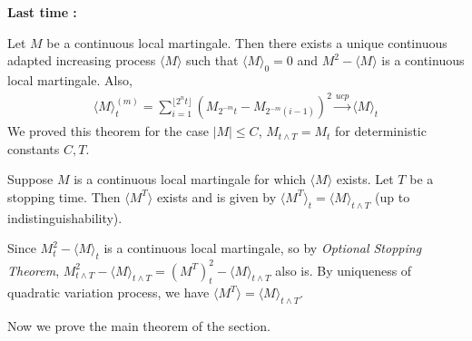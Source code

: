 \documentclass[12pt,a4paper]{article}
\newenvironment{proof}
{\begin{changemargin}{0.5cm}{0.5cm} 
	}%
	{\end{changemargin}
}
\newenvironment{p}
{\begin{proof} 
	}%
	{\end{proof}
}
\begin{document}
\textbf{Last time :}

\thm Let $M$ be a continuous local martingale. Then there exists a unique continuous adapted increasing process $\langle M \rangle$ such that $\langle  M \rangle_0 = 0$ and $M^2 - \langle M \rangle$ is a continuous local martingale. Also,
\begin{align*}
\langle M \rangle_t^{(m)} = \sum_{i=1}^{\lfloor 2^n t \rfloor} (M_{2^{-m}t} - M_{2^{-m}(i-1)})^2 \xrightarrow{ucp} \langle M \rangle_t
\end{align*}
We proved this theorem for the case $|M|\leq C$, $M_{t\wedge T} = M_t$ for deterministic constants $C, T$. 
\s

\lem Suppose $M$ is a continuous local martingale for which $\langle M \rangle$ exists. Let $T$ be a stopping time. Then $\langle M^T \rangle$ exists and is given by $\langle M^T\rangle_t = \langle M \rangle_{t\wedge T}$ (up to indistinguishability).
\begin{p}
\pf Since $M_t^2 - \langle M \rangle_t$ is a continuous local martingale, so by \emph{Optional Stopping Theorem}, $M^2_{t\wedge T} - \langle M\rangle_{t\wedge T}= (M^T)^2_t - \langle M \rangle_{t\wedge T}$ also is. By uniqueness of quadratic variation process, we have $\langle M^T \rangle = \langle M \rangle_{t\wedge T}$.

\eop
\end{p}
\s

Now we prove the main theorem of the section.
\s
\end{document}
